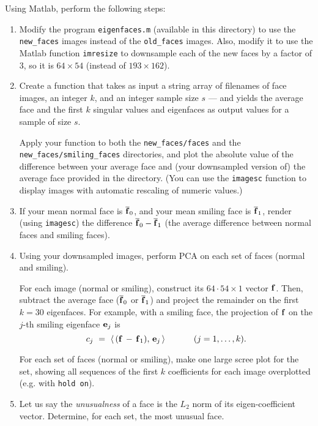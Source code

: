 \documentclass[10pt]{article}
\newcommand{\vect}[1]{{\mbox{\boldmath{$\bf #1$}}}}
\newcommand{\innerprod}[2]{{\langle\,{#1},\,{#2}\,\rangle}}
\begin{document}
\begin{enumerate}
Using Matlab, perform the following steps:
\begin{enumerate}

\item
Modify the program \verb"eigenfaces.m" (available in this directory)
to use the \verb"new_faces" images instead of the \verb"old_faces" images.
Also, modify it to use the Matlab function \verb"imresize" to downsample
each of the new faces by a factor of 3, so it is $64 \times 54$ (instead of $193 \times 162$).

\item
Create a function that
takes as input a string array of filenames of face images, an integer $k$,
and an integer sample size $s$ ---
and yields the average face and the first $k$ singular values and eigenfaces as output values
for a sample of size $s$.

Apply your function to
both the \verb"new_faces/faces"
and the \verb"new_faces/smiling_faces"
directories,
and plot the absolute value of the difference between your average face and (your downsampled version of)
the average face provided in the directory.
(You can use the \verb"imagesc" function to display images with automatic rescaling of numeric values.)

\item
If your mean normal face is $\overline{\vect{f}}_0$, and your mean smiling face is $\overline{\vect{f}}_1$,
render (using \verb"imagesc")
the difference $\overline{\vect{f}}_0-\overline{\vect{f}}_1$
(the average difference between normal faces and smiling faces).

\item
Using your downsampled images,
perform PCA on each set of faces (normal and smiling). 

For each image (normal or smiling), construct its $64\cdot 54 \times 1$ vector $\vect{f}$.
Then, subtract the average face
($\overline{\vect{f}}_0$ or $\overline{\vect{f}}_1$)
and project the remainder on the first $k = 30$ eigenfaces.
For example, with a smiling face,
the projection of $\vect{f}$ on the $j$-th smiling eigenface $\vect{e}_j$ is
\[
c_j ~=~ \innerprod{(\vect{f} \, - \, \vect{f}_1)}{\vect{e}_j}  ~~~~~~~~~~ (j = 1,\dots,k).
\]

For each set of faces (normal or smiling),
make one large scree plot for the set, showing all sequences of the first $k$ coefficients
for each image overplotted (e.g. with \verb"hold on").

\item
Let us say the \emph{unusualness} of a face is the $L_2$ norm of its eigen-coefficient vector.
Determine, for each set, the most unusual face.


\end{enumerate}
\end{enumerate}
\end{document}
